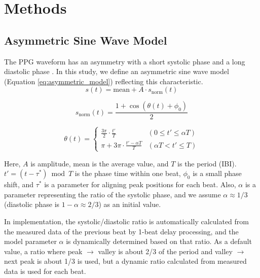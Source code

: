 \documentclass[fleqn,10pt,twocolumn]{AROB}
\begin{document}

\section{Methods}

\subsection{Asymmetric Sine Wave Model}
The PPG waveform has an asymmetry with a short systolic phase and a long diastolic phase \cite{ref15}. In this study, we define an asymmetric sine wave model (Equation \ref{eq:asymmetric_model}) reflecting this characteristic.
\begin{equation}
s(t) = \text{mean} + A \cdot s_{\text{norm}}(t)
\label{eq:asymmetric_model}
\end{equation}

\begin{equation}
s_{\text{norm}}(t) = \frac{1 + \cos(\theta(t) + \phi_0)}{2}
\label{eq:asymmetric_norm}
\end{equation}

\begin{equation}
\theta(t) = \begin{cases}
\frac{3\pi}{2} \cdot \frac{t'}{T} & (0 \leq t' \leq \alpha T) \\
\pi + 3\pi \cdot \frac{t' - \alpha T}{T} & 
(\alpha T < t' \leq T)
\end{cases}
\label{eq:asymmetric_theta}
\end{equation}

Here, $A$ is amplitude, mean is the average value, and $T$ is the period (IBI). $t' = (t - \tau^*) \bmod T$ is the phase time within one beat, $\phi_0$ is a small phase shift, and $\tau^*$ is a parameter for aligning peak positions for each beat. Also, $\alpha$ is a parameter representing the ratio of the systolic phase, and we assume $\alpha \approx 1/3$ (diastolic phase is $1-\alpha \approx 2/3$) as an initial value.

In implementation, the systolic/diastolic ratio is automatically calculated from the measured data of the previous beat by 1-beat delay processing, and the model parameter $\alpha$ is dynamically determined based on that ratio. As a default value, a ratio where peak $\to$ valley is about 2/3 of the period and valley $\to$ next peak is about 1/3 is used, but a dynamic ratio calculated from measured data is used for each beat.
\end{document}
